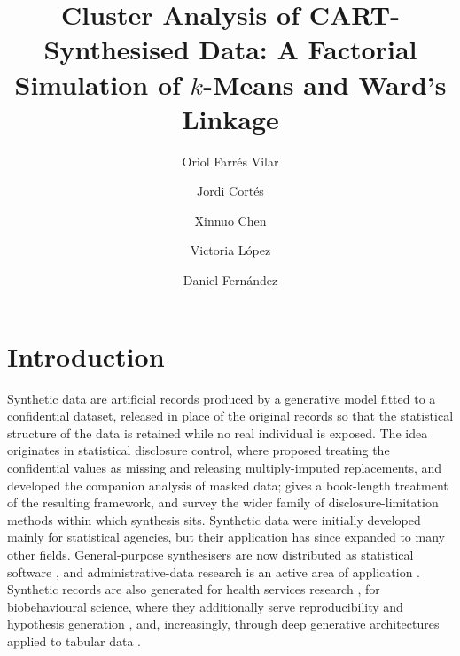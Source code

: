 \documentclass[pdflatex,referee]{sn-jnl}
\begin{document}
\title{Cluster Analysis of CART-Synthesised Data: A Factorial Simulation of
       $k$-Means and Ward's Linkage}

\author[1]{Oriol Farr\'es Vilar}
\author[2,5]{Jordi Cort\'es}
\author[3]{Xinnuo Chen}
\author[4]{Victoria L\'opez}
\author[5]{Daniel Fern\'andez}


\abstract{}


\maketitle

\section{Introduction}

Synthetic data are artificial records produced by a generative model fitted to
a confidential dataset, released in place of the original records so that the
statistical structure of the data is retained while no real individual is
exposed. The idea originates in statistical disclosure control, where
\citet{rubin1993} proposed treating the confidential values as missing and
releasing multiply-imputed replacements, and \citet{little1993} developed the
companion analysis of masked data; \citet{drechsler2011} gives a book-length
treatment of the resulting framework, and \citet{matthews2011} survey the wider
family of disclosure-limitation methods within which synthesis sits. Synthetic
data were initially developed mainly for statistical agencies, but their
application has since expanded to many other fields. General-purpose
synthesisers are now distributed as statistical software
\citep{nowok2016,templ2017}, and administrative-data research is an active
area of application \citep{kokosi2022}. Synthetic records are also generated
for health services research \citep{gonzales2023,giuffre2023}, for
biobehavioural science, where they additionally serve reproducibility and
hypothesis generation \citep{quintana2020}, and, increasingly, through deep
generative architectures applied to tabular data \citep{goyal2024,zhao2024}.
\end{document}
